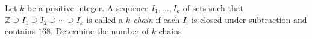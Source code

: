 Let $k$ be a positive integer. A sequence $I_1,\ldots,I_k$ of sets such that $\mathbb{Z}\supseteq I_1\supseteq I_2\supseteq\cdots\supseteq I_k$ is called a \emph{$k$-chain} if each $I_i$ is closed under subtraction and contains $168$. Determine the number of $k$-chains.
